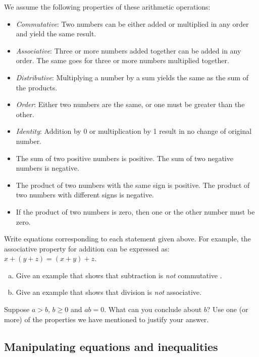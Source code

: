 We assume the following properties of these arithmetic operations:

\begin{itemize}
\item
\emph{Commutative}:  Two numbers can be either added or multiplied in any order and yield the same result.
\item
\emph{Associative}:  Three or more numbers added together can be added in any order.  The same goes for three or more numbers multiplied together.
\item
\emph{Distributive}:   Multiplying a number by a sum yields the same as the sum of the products.
\item
\emph{Order}:   Either two numbers are the same, or one must be greater than the other.
\item
\emph{Identity}:   Addition by 0 or multiplication by 1 result in no change of original number.
\item
The sum of two  positive numbers  is positive. The sum of two negative numbers is negative.
\item
The product of two  numbers with the same sign is positive. The product of two numbers with different signs is negative.
\item
If  the product of two numbers is zero, then one or the other number must be zero.
\end {itemize}

\begin{exercise}{1}
Write equations corresponding to each statement  given above. For example, the associative property for addition can be expressed as: $x + (y+z) = (x+y)+z$.
\end{exercise}
\begin{exercise}{2}
\begin{enumerate}[(a)]
\item
Give an example that shows that subtraction is \emph{not} commutative 
.\item
Give an example that shows that division is \emph{not} associative. 
\end{enumerate}
\end{exercise}
\begin{exercise}{3}
Suppose $a > b$,  $b \ge 0$ and $ab = 0$.  What can you conclude about $b$? Use one (or more)  of the properties we have mentioned to justify your answer.
\end{exercise}

\subsection {Manipulating equations and inequalities}

